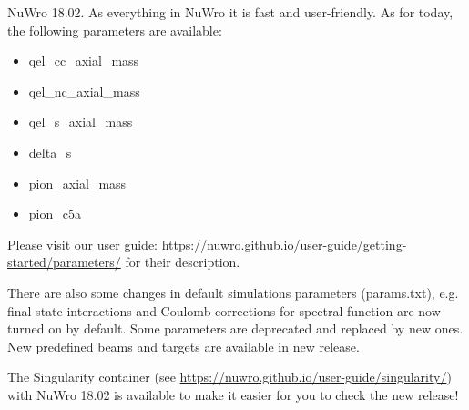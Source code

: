 \documentclass{article}
\begin{document}
\begin{minipage}{0.71\textwidth}
\setlength{\linewidth}{0.9\textwidth}
\setlength{\columnsep}{0.5cm}

\begin{multicols}{2}{

NuWro 18.02. As everything in NuWro it is fast and user-friendly. As for today, the following parameters are available:

\begin{itemize}
 \item {\sc qel\_cc\_axial\_mass}
 \item {\sc qel\_nc\_axial\_mass}
 \item {\sc qel\_s\_axial\_mass}
 \item {\sc delta\_s}
 \item {\sc pion\_axial\_mass}
 \item {\sc pion\_c5a}
\end{itemize}

Please visit our user guide: \url{https://nuwro.github.io/user-guide/getting-started/parameters/} for their description.


There are also some changes in default simulations parameters ({\sc params.txt}), e.g. final state interactions and Coulomb corrections for spectral function are now turned on by default. Some parameters are deprecated and replaced by new ones. New predefined beams and targets are available in new release.

The Singularity container (see \url{https://nuwro.github.io/user-guide/singularity/}) with NuWro 18.02 is available to make it easier for you to check the new release!

}\end{multicols}

\end{minipage}
\end{document}
